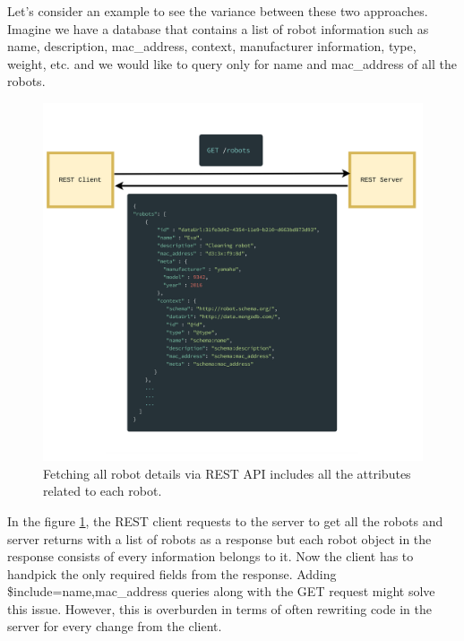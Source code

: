 	Let's consider an example to see the variance between these two approaches. Imagine we have a database that contains a list of robot information such as name, description, mac\_address, context, manufacturer information, type, weight, etc. and we would like to query only for name and mac\_address of all the robots. 
	
	\begin{figure}[!htbp] 
		\begin{center}
			\includegraphics[trim={0 0 0 2cm},clip,scale=0.08]{./images/png/rest_declarative}	
			\caption{Fetching all robot details via REST API includes all the attributes related to each robot.}	
			\label{fig:rest_declarative}	
		\end{center}
	\end{figure}

	In the figure \ref{fig:rest_declarative}, the REST client requests to the server to get all the robots and server returns with a list of robots as a response but each robot object in the response consists of every information belongs to it. Now the client has to handpick the only required fields from the response. 
	Adding \$include=name,mac\_address queries along with the GET request might solve this issue. However, this is overburden in terms of often rewriting code in the server for every change from the client.   
	
